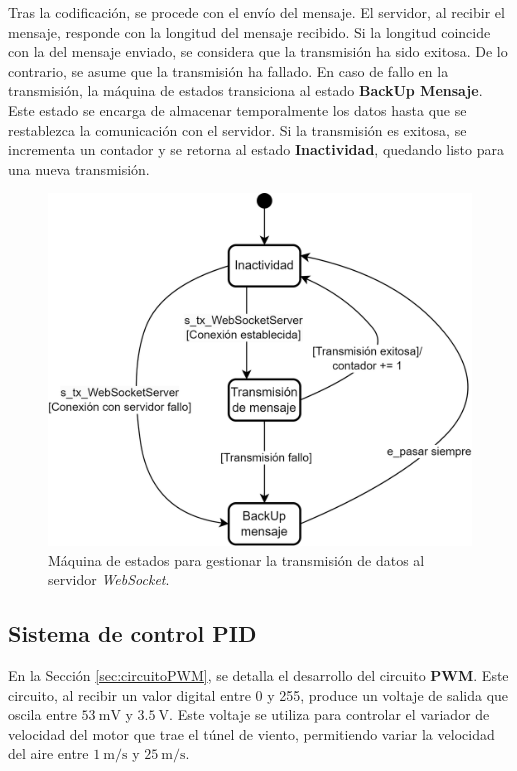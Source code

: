 Tras la codificación, se procede con el envío del mensaje. El servidor, al recibir el mensaje, responde con la longitud del mensaje recibido. Si la longitud coincide con la del mensaje enviado, se considera que la transmisión ha sido exitosa. De lo contrario, se asume que la transmisión ha fallado. En caso de fallo en la transmisión, la máquina de estados transiciona al estado \textbf{BackUp Mensaje}. Este estado se encarga de almacenar temporalmente los datos hasta que se restablezca la comunicación con el servidor. Si la transmisión es exitosa, se incrementa un contador y se retorna al estado \textbf{Inactividad}, quedando listo para una nueva transmisión.


\begin{figure}[H]
    \centering
    \includegraphics[width=0.7\linewidth]{Figuras/datalogger/Firmware/sc_transmisionServer.png}
    \caption{Máquina de estados para gestionar la transmisión de datos al servidor \textit{WebSocket}.}
    \label{fig:sc_transmisionServer}
\end{figure}


\subsection{Sistema de control PID}\label{sec:sistemaDeControlPid}

En la Sección \ref{sec:circuitoPWM}, se detalla el desarrollo del circuito \textbf{PWM}. Este circuito, al recibir un valor digital entre 0 y 255, produce un voltaje de salida que oscila entre $\SI{53}{\milli\volt}$ y $\SI{3.5}{\volt}$. Este voltaje se utiliza para controlar el variador de velocidad del motor que trae el túnel de viento, permitiendo variar la velocidad del aire entre $\SI{1}{\meter\per\second}$ y $\SI{25}{\meter\per\second}$.

